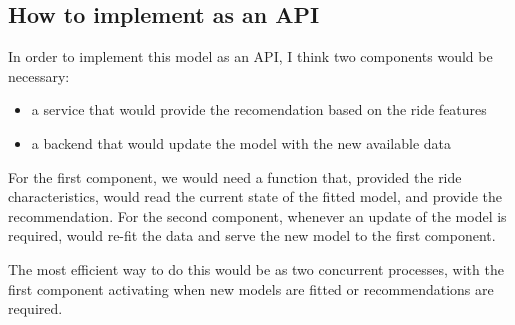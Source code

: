 \documentclass[11pt]{article}
\begin{document}
\subsection{How to implement as an API}
\label{sec:org942288b}
In order to implement this model as an API, I think two components would
be necessary:
\begin{itemize}
\item a service that would provide the recomendation based on the ride features
\item a backend that would update the model with the new available data
\end{itemize}

For the first component, we would need a function that, provided the
ride characteristics, would read the current state of the fitted model, and
provide the recommendation.
For the second component, whenever an update of the model is required, would
re-fit the data and serve the new model to the first component.

The most efficient way to do this would be as two concurrent processes, with
the first component activating when new models are fitted or recommendations
are required.
\end{document}
